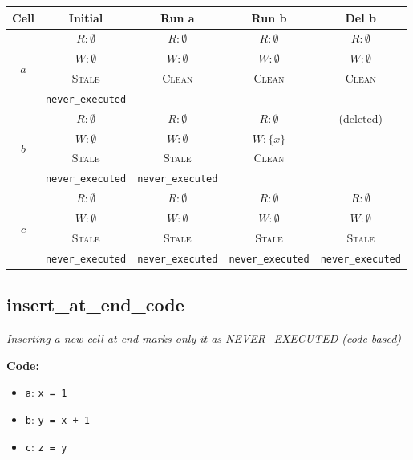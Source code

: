 \documentclass{article}
\begin{document}
\begin{center}
\small
\begin{tabular}{|c|c|c|c|c|}
\hline
\textbf{Cell} & \textbf{Initial} & \textbf{Run a} & \textbf{Run b} & \textbf{Del b} \\
\hline
\multirow{4}{*}{$a$}
  & $R: \emptyset$ & $R: \emptyset$ & $R: \emptyset$ & $R: \emptyset$ \\
  & $W: \emptyset$ & $W: \emptyset$ & $W: \emptyset$ & $W: \emptyset$ \\
  & \textsc{Stale} & \textsc{Clean} & \textsc{Clean} & \textsc{Clean} \\
  & \footnotesize\texttt{never\_executed} &  &  &  \\
\hline
\multirow{4}{*}{$b$}
  & $R: \emptyset$ & $R: \emptyset$ & $R: \emptyset$ & (deleted) \\
  & $W: \emptyset$ & $W: \emptyset$ & $W: \{x\}$ &  \\
  & \textsc{Stale} & \textsc{Stale} & \textsc{Clean} &  \\
  & \footnotesize\texttt{never\_executed} & \footnotesize\texttt{never\_executed} &  &  \\
\hline
\multirow{4}{*}{$c$}
  & $R: \emptyset$ & $R: \emptyset$ & $R: \emptyset$ & $R: \emptyset$ \\
  & $W: \emptyset$ & $W: \emptyset$ & $W: \emptyset$ & $W: \emptyset$ \\
  & \textsc{Stale} & \textsc{Stale} & \textsc{Stale} & \textsc{Stale} \\
  & \footnotesize\texttt{never\_executed} & \footnotesize\texttt{never\_executed} & \footnotesize\texttt{never\_executed} & \footnotesize\texttt{never\_executed} \\
\hline
\end{tabular}
\end{center}


\subsection{insert\_at\_end\_code}
\textit{Inserting a new cell at end marks only it as NEVER\_EXECUTED (code-based)}

\textbf{Code:}
\begin{itemize}
  \item \texttt{a}: \verb|x = 1|
  \item \texttt{b}: \verb|y = x + 1|
  \item \texttt{c}: \verb|z = y|
\end{itemize}
\end{document}
